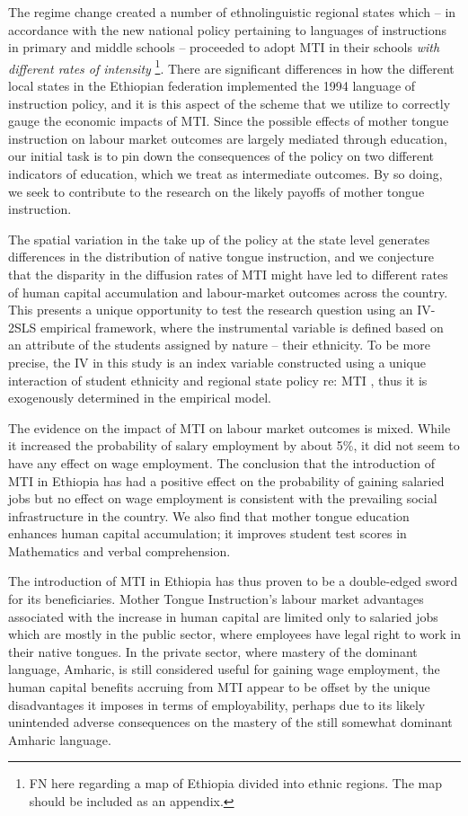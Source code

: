 The regime change created a number of ethnolinguistic regional states which – in accordance with the new national policy pertaining to languages of instructions in primary and middle schools – proceeded to adopt MTI in their schools \emph{ with different rates of intensity }\footnote{FN here regarding a map of Ethiopia divided into ethnic regions. The map should be included as an appendix.}. There are significant differences in how the different local states in the Ethiopian federation implemented the 1994 language of instruction policy, and it is this aspect of the scheme that we utilize to correctly gauge the economic impacts of MTI. Since the possible effects of mother tongue instruction on labour market outcomes are largely mediated through education, our initial task is to pin down the consequences of the policy on two different indicators of education, which we treat as intermediate outcomes. By so doing, we seek to contribute to the research on the likely payoffs of mother tongue instruction. 

The spatial variation in the take up of the policy at the state level generates differences in the distribution of native tongue instruction, and we conjecture that the disparity in the diffusion rates of MTI might have led to different rates of human capital accumulation and labour-market outcomes across the country. This presents a unique opportunity to test the research question using an IV-2SLS empirical framework, where the instrumental variable is defined based on an attribute of the students assigned by nature – their ethnicity.  To be more precise, the IV in this study is an index variable constructed using a unique interaction of student ethnicity and regional state policy re: MTI , thus it is exogenously determined in the empirical model. 

The evidence on the impact of MTI on labour market outcomes is mixed. While it increased the probability of salary employment by about 5\%, it did not seem to have any effect on wage employment. The conclusion that the introduction of MTI in Ethiopia has had a positive effect on the probability of gaining salaried jobs but no effect on wage employment is consistent with the prevailing social infrastructure in the country. We also find that mother tongue education enhances human capital accumulation; it improves student test scores in Mathematics and verbal comprehension.  

The introduction of MTI in Ethiopia has thus proven to be a double-edged sword for its beneficiaries.  Mother Tongue Instruction’s labour market advantages associated with the increase in human capital are limited only to salaried jobs which are mostly in the public sector, where employees have legal right to work in their native tongues. In the private sector, where mastery of the dominant language, Amharic, is still considered useful for gaining wage employment, the human capital benefits accruing from MTI appear to be offset by the unique disadvantages it imposes in terms of employability, perhaps due to its likely unintended adverse consequences on the mastery of the still somewhat dominant Amharic language.

